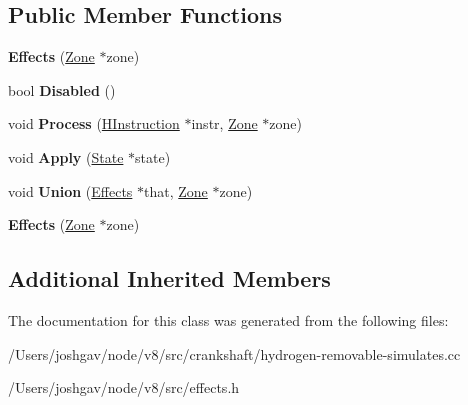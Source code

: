 \subsection*{Public Member Functions}
\begin{DoxyCompactItemize}
\item 
{\bfseries Effects} (\hyperlink{classv8_1_1internal_1_1_zone}{Zone} $\ast$zone)\hypertarget{classv8_1_1internal_1_1_effects_abf02ef877195c8d0045fd0b9e694c4bf}{}\label{classv8_1_1internal_1_1_effects_abf02ef877195c8d0045fd0b9e694c4bf}

\item 
bool {\bfseries Disabled} ()\hypertarget{classv8_1_1internal_1_1_effects_a96c11797850446c3efc68d8b1d549009}{}\label{classv8_1_1internal_1_1_effects_a96c11797850446c3efc68d8b1d549009}

\item 
void {\bfseries Process} (\hyperlink{classv8_1_1internal_1_1_h_instruction}{H\+Instruction} $\ast$instr, \hyperlink{classv8_1_1internal_1_1_zone}{Zone} $\ast$zone)\hypertarget{classv8_1_1internal_1_1_effects_acef86469bea1fe2748eb2ddfe35cfba8}{}\label{classv8_1_1internal_1_1_effects_acef86469bea1fe2748eb2ddfe35cfba8}

\item 
void {\bfseries Apply} (\hyperlink{classv8_1_1internal_1_1_state}{State} $\ast$state)\hypertarget{classv8_1_1internal_1_1_effects_a3ee94c927da461866aff23a3346674df}{}\label{classv8_1_1internal_1_1_effects_a3ee94c927da461866aff23a3346674df}

\item 
void {\bfseries Union} (\hyperlink{classv8_1_1internal_1_1_effects}{Effects} $\ast$that, \hyperlink{classv8_1_1internal_1_1_zone}{Zone} $\ast$zone)\hypertarget{classv8_1_1internal_1_1_effects_a21244823e081f2fefaea4bdbd2375a0b}{}\label{classv8_1_1internal_1_1_effects_a21244823e081f2fefaea4bdbd2375a0b}

\item 
{\bfseries Effects} (\hyperlink{classv8_1_1internal_1_1_zone}{Zone} $\ast$zone)\hypertarget{classv8_1_1internal_1_1_effects_abf02ef877195c8d0045fd0b9e694c4bf}{}\label{classv8_1_1internal_1_1_effects_abf02ef877195c8d0045fd0b9e694c4bf}

\end{DoxyCompactItemize}
\subsection*{Additional Inherited Members}


The documentation for this class was generated from the following files\+:\begin{DoxyCompactItemize}
\item 
/\+Users/joshgav/node/v8/src/crankshaft/hydrogen-\/removable-\/simulates.\+cc\item 
/\+Users/joshgav/node/v8/src/effects.\+h\end{DoxyCompactItemize}
